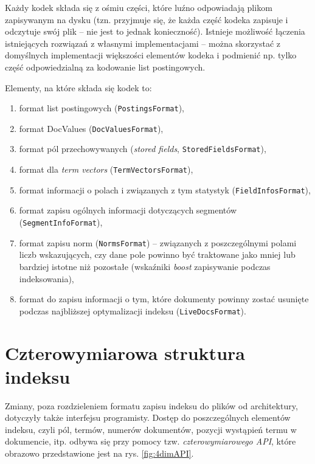 Każdy kodek składa się z ośmiu części, które luźno odpowiadają plikom zapisywanym na dysku (tzn. przyjmuje się, że każda część kodeka zapisuje i odczytuje swój plik -- nie jest to jednak konieczność). Istnieje możliwość łączenia istniejących rozwiązań z własnymi implementacjami -- można skorzystać z domyślnych implementacji większości elementów kodeka i podmienić np. tylko część odpowiedzialną za kodowanie list postingowych.

Elementy, na które składa się kodek to:
\begin{enumerate}
 \item format list postingowych (\texttt{PostingsFormat}),
 \item format DocValues (\texttt{DocValuesFormat}),
 \item format pól przechowywanych (\emph{stored fields}, \texttt{StoredFieldsFormat}),
 \item format dla \emph{term vectors} (\texttt{TermVectorsFormat}),
 \item format informacji o polach i związanych z tym statystyk (\texttt{FieldInfosFormat}),
 \item format zapisu ogólnych informacji dotyczących segmentów (\texttt{SegmentInfoFormat}),
 \item format zapisu norm (\texttt{NormsFormat}) -- związanych z poszczególnymi polami liczb wskazujących, czy dane pole powinno być traktowane jako mniej lub bardziej istotne niż pozostałe (wskaźniki \emph{boost} zapisywanie podczas indeksowania),
 \item format do zapisu informacji o tym, które dokumenty powinny zostać usunięte podczas najbliższej optymalizacji indeksu (\texttt{LiveDocsFormat}).
\end{enumerate}

\section{Czterowymiarowa struktura indeksu}

Zmiany, poza rozdzieleniem formatu zapisu indeksu do plików od architektury, dotyczyły także interfejsu programisty. Dostęp do poszczególnych elementów indeksu, czyli pól, termów, numerów dokumentów, pozycji wystąpień termu w dokumencie, itp. odbywa się przy pomocy tzw. \emph{czterowymiarowego API}, które obrazowo przedstawione jest na rys. \ref{fig:4dimAPI}.

